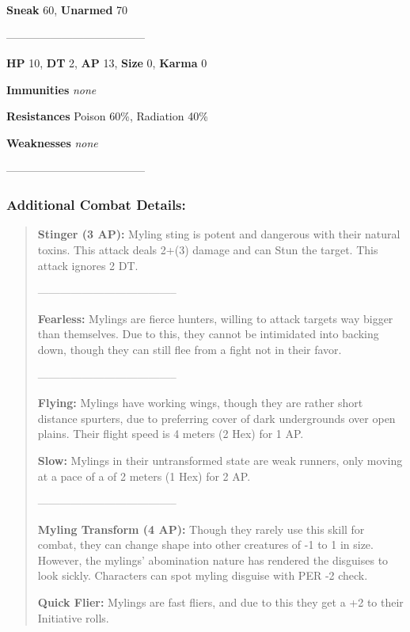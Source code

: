 \documentclass[11pt,a4paper,twocolumn]{book}
\begin{document}
\noindent
\textbf{Sneak} 60, \textbf{Unarmed} 70	%

--------------------------------------

\noindent
\textbf{HP} 10, \textbf{DT} 2, \textbf{AP} 13, \textbf{Size} 0, \textbf{Karma} 0


\noindent
\textbf{Immunities} \emph{none} %

\noindent
\textbf{Resistances} Poison 60\%, Radiation 40\%%

\noindent
\textbf{Weaknesses} \emph{none}%

--------------------------------------
	
	\subsubsection*{Additional Combat Details:}
	\begin{verse}
		\textbf{Stinger (3 AP):} Myling sting is potent and dangerous with their natural toxins. This attack deals 2+(3) damage and can Stun the target. This attack ignores 2 DT.
		
	--------------------------------------	
		
		\textbf{Fearless:} Mylings are fierce hunters, willing to attack targets way bigger than themselves. Due to this, they cannot be intimidated into backing down, though they can still flee from a fight not in their favor.
		
		--------------------------------------
		
		\textbf{Flying:} Mylings have working wings, though they are rather short distance spurters, due to preferring cover of dark undergrounds over open plains. Their flight speed is 4 meters (2 Hex) for 1 AP.
		
		\textbf{Slow:} Mylings in their untransformed state are weak runners, only moving at a pace of a of 2 meters (1 Hex) for 2 AP.
		
		--------------------------------------
		
		\textbf{Myling Transform (4 AP):} Though they rarely use this skill for combat, they can change shape into other creatures of -1 to 1 in size. However, the mylings' abomination nature has rendered the disguises to look sickly. Characters can spot myling disguise with PER -2 check.
		
		\textbf{Quick Flier:} Mylings are fast fliers, and due to this they get a +2 to their Initiative rolls.
%		
%		
	\end{verse}
	
\end{document}
